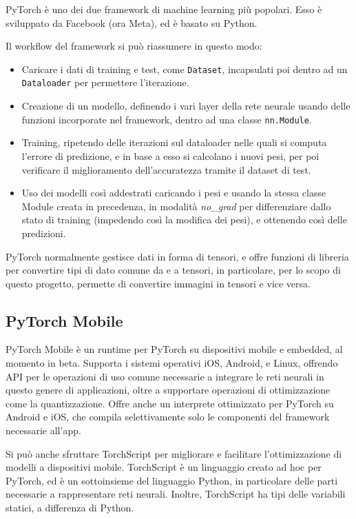 PyTorch è uno dei due framework di machine learning più popolari.
Esso è sviluppato da Facebook (ora Meta), ed è basato su Python.

Il workflow del framework si può riassumere in questo modo:

\begin{itemize}
    \item Caricare i dati di training e test, come \texttt{Dataset}, 
    incapsulati poi dentro ad un \texttt{Dataloader} per permettere l'iterazione.
    \item Creazione di un modello, definendo i vari layer della rete neurale usando
    delle funzioni incorporate nel framework, dentro ad una classe \texttt{nn.Module}.
    \item Training, ripetendo delle iterazioni sul dataloader nelle quali si computa
    l'errore di predizione, e in base a esso si calcolano i nuovi pesi, per poi verificare
    il miglioramento dell'accuratezza tramite il dataset di test.
    \item Uso dei modelli così addestrati caricando i pesi e usando la stessa classe Module
    creata in precedenza, in modalità \emph{no\_grad} per differenziare dallo stato di
    training (impedendo così la modifica dei pesi), e ottenendo così delle predizioni.
\end{itemize}

PyTorch normalmente gestisce dati in forma di tensori, e offre funzioni di libreria per
convertire tipi di dato comune da e a tensori, in particolare, per lo scopo di questo
progetto, permette di convertire immagini in tensori e vice versa.

\subsection{PyTorch Mobile}

PyTorch Mobile\cite{sito_pytorch_mobile}\cite{doc_pytorch_mobile} è un runtime per PyTorch su dispositivi mobile e embedded, al momento in
beta. Supporta i sistemi operativi iOS, Android, e Linux, offrendo API per le operazioni
di uso comune necessarie a integrare le reti neurali in questo genere di applicazioni,
oltre a supportare operazioni di ottimizzazione come la quantizzazione. Offre anche 
un interprete ottimizzato per PyTorch su Android e iOS, che compila selettivamente solo
le componenti del framework necessarie all'app.

Si può anche sfruttare TorchScript per migliorare e facilitare l'ottimizzazione di modelli
a dispositivi mobile. TorchScript è un linguaggio creato ad hoc per PyTorch, ed è un sottoinsieme
del linguaggio Python, in particolare delle parti necessarie a rappresentare reti 
neurali. Inoltre, TorchScript ha tipi delle variabili statici, a differenza di Python.


